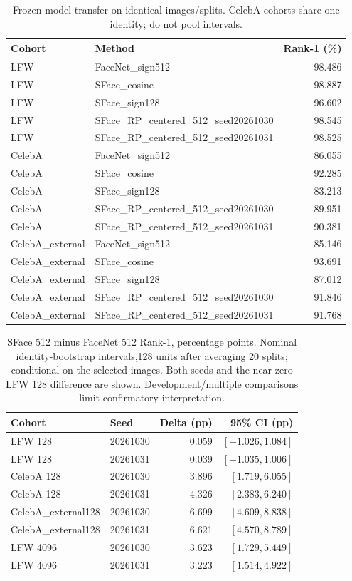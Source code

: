 \begin{table}[t]
\caption{Frozen-model transfer on identical images/splits. CelebA cohorts share one identity; do not pool intervals.}
\label{tab:v3transfer}\centering\small
\setlength{\tabcolsep}{3pt}
\begin{tabular}{llr}
\toprule
Cohort & Method & Rank-1 (\%) \\
\midrule
LFW & FaceNet\_sign512 & 98.486 \\
LFW & SFace\_cosine & 98.887 \\
LFW & SFace\_sign128 & 96.602 \\
LFW & SFace\_RP\_centered\_512\_seed20261030 & 98.545 \\
LFW & SFace\_RP\_centered\_512\_seed20261031 & 98.525 \\
CelebA & FaceNet\_sign512 & 86.055 \\
CelebA & SFace\_cosine & 92.285 \\
CelebA & SFace\_sign128 & 83.213 \\
CelebA & SFace\_RP\_centered\_512\_seed20261030 & 89.951 \\
CelebA & SFace\_RP\_centered\_512\_seed20261031 & 90.381 \\
CelebA\_external & FaceNet\_sign512 & 85.146 \\
CelebA\_external & SFace\_cosine & 93.691 \\
CelebA\_external & SFace\_sign128 & 87.012 \\
CelebA\_external & SFace\_RP\_centered\_512\_seed20261030 & 91.846 \\
CelebA\_external & SFace\_RP\_centered\_512\_seed20261031 & 91.768 \\
\bottomrule
\end{tabular}
\end{table}


\begin{table}[t]
\caption{SFace 512 minus FaceNet 512 Rank-1, percentage points. Nominal identity-bootstrap intervals,128 units after averaging 20 splits; conditional on the selected images. Both seeds and the near-zero LFW 128 difference are shown. Development/multiple comparisons limit confirmatory interpretation.}
\label{tab:v3pairedCI}\centering\small
\setlength{\tabcolsep}{3pt}
\begin{tabular}{llrr}
\toprule
Cohort & Seed & Delta (pp) &95\% CI (pp) \\
\midrule
LFW 128 & 20261030 & 0.059 & $[-1.026,1.084]$ \\
LFW 128 & 20261031 & 0.039 & $[-1.035,1.006]$ \\
CelebA 128 & 20261030 & 3.896 & $[1.719,6.055]$ \\
CelebA 128 & 20261031 & 4.326 & $[2.383,6.240]$ \\
CelebA\_external128 & 20261030 & 6.699 & $[4.609,8.838]$ \\
CelebA\_external128 & 20261031 & 6.621 & $[4.570,8.789]$ \\
LFW 4096 & 20261030 & 3.623 & $[1.729,5.449]$ \\
LFW 4096 & 20261031 & 3.223 & $[1.514,4.922]$ \\
\bottomrule
\end{tabular}
\end{table}


